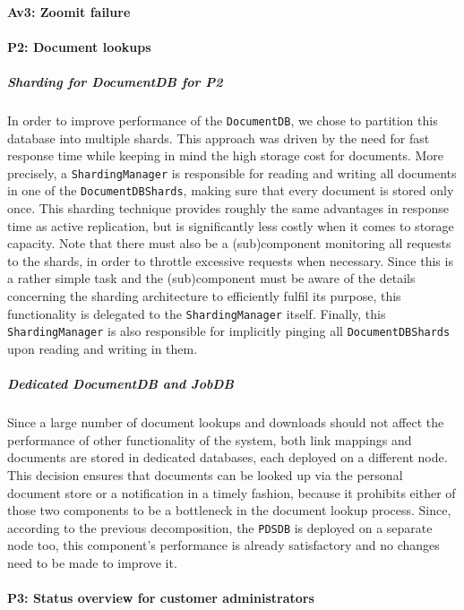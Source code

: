 \documentclass[a4paper,10pt]{article}
\begin{document}
\paragraph{Av3\@: Zoomit failure}

\paragraph{P2\@: Document lookups}
\subparagraph{Sharding for DocumentDB for P2}
In order to improve performance of the \texttt{DocumentDB}, we chose to partition this database into multiple shards. This approach was driven by the need for fast response time while keeping in mind the high storage cost for documents. More precisely, a \texttt{ShardingManager} is responsible for reading and writing all documents in one of the \texttt{DocumentDBShards}, making sure that every document is stored only once. This sharding technique provides roughly the same advantages in response time as active replication, but is significantly less costly when it comes to storage capacity.
Note that there must also be a (sub)component monitoring all requests to the shards, in order to throttle excessive requests when necessary. Since this is a rather simple task and the (sub)component must be aware of the details concerning the sharding architecture to efficiently fulfil its purpose, this functionality is delegated to the \texttt{ShardingManager} itself. Finally, this \texttt{ShardingManager} is also responsible for implicitly pinging all \texttt{DocumentDBShards} upon reading and writing in them.

\subparagraph{Dedicated DocumentDB and JobDB}
Since a large number of document lookups and downloads should not affect the performance of other functionality of the system, both link mappings and documents are stored in dedicated databases, each deployed on a different node. This decision ensures that documents can be looked up via the personal document store or a notification in a timely fashion, because it prohibits either of those two components to be a bottleneck in the document lookup process. Since, according to the previous decomposition, the \texttt{PDSDB} is deployed on a separate node too, this component's performance is already satisfactory and no changes need to be made to improve it.

\paragraph{P3\@: Status overview for customer administrators}
\end{document}
